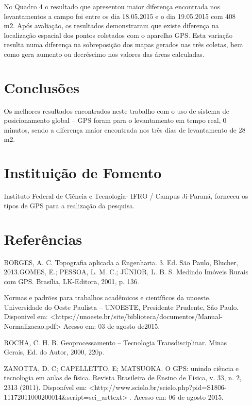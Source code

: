 \documentclass[article,12pt,onesidea,4paper,english,brazil]{abntex2}
\begin{document}
No Quadro 4 o resultado que apresentou maior diferença encontrada nos levantamentos a campo foi entre os dia 18.05.2015 e o dia 19.05.2015 com 408 m2.
Após avaliação, os resultados demonstraram que existe diferença na localização espacial dos pontos coletados com o aparelho GPS. Esta variação resulta numa diferença na sobreposição dos mapas gerados nas três coletas, bem como gera aumento ou decréscimo nos valores das áreas calculadas.

	
	\section*{Conclusões}
	
	Os melhores resultados encontrados neste trabalho com o uso de sistema de posicionamento global – GPS foram para o levantamento em tempo real, 0 minutos, sendo a diferença maior encontrada nos três dias de levantamento de 28 m2.
	
	\section*{Instituição de Fomento}
	
	Instituto Federal de Ciência e Tecnologia- IFRO / Campus Ji-Paraná, forneceu os tipos de GPS para a realização da pesquisa.
	
	\sloppy
	\section*{Referências}
	
	\noindent BORGES, A. C. Topografia aplicada a Engenharia. 3. Ed. São Paulo, Blucher, 2013.GOMES, E.; PESSOA, L. M. C.; JÚNIOR, L. B. S. Medindo Imóveis Rurais
	com GPS. Brasília, LK-Editora, 2001, p. 136.
	
	
	\noindent Normas e padrões para trabalhos acadêmicos e científicos da unoeste. Universidade do Oeste Paulista – UNOESTE, Presidente Prudente, São Paulo. Disponivel em: <https://unoeste.br/site/biblioteca/documentos/Manual-Normalizacao.pdf>  Acesso em: 03 de agosto de2015.
	
	\noindent ROCHA, C. H. B. Geoprocessamento – Tecnologia Transdisciplinar. Minas Gerais, Ed. do Autor, 2000, 220p.
	
	\noindent ZANOTTA, D. C; CAPELLETTO, E; MATSUOKA. O GPS: unindo ciência e
	tecnologia em aulas de física. Revista Brasileira de Ensino de Física, v. 33, n. 2, 2313 (2011). Disponível em: <http://www.scielo.br/scielo.php?pid=S1806-11172011000200014\&script=sci\_arttext> . Acesso em: 06 de agosto 2015.
\end{document}
